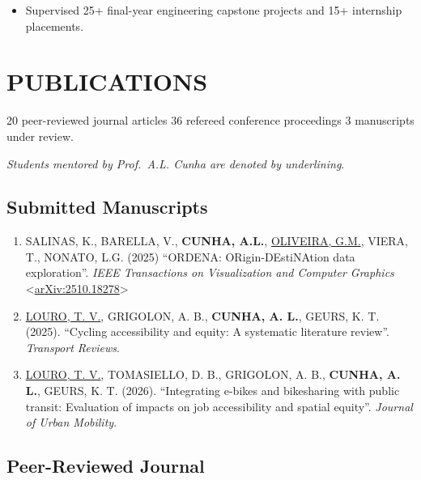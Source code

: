 \documentclass[
  10pt,
  a4paper,
  DIV=11,
  numbers=noendperiod]{scrartcl}
\providecommand{\tightlist}{%
  \setlength{\itemsep}{0pt}\setlength{\parskip}{0pt}}
\begin{document}
\begin{itemize}
\tightlist
\item
  Supervised 25+ final-year engineering capstone projects and 15+
  internship placements.
\end{itemize}

\hrulefill

\section{PUBLICATIONS}\label{sec-publications}

20 peer-reviewed journal articles \textbar{} 36 refereed conference
proceedings \textbar{} 3 manuscripts under review.

\emph{Students mentored by Prof.~A.L. Cunha are denoted by underlining}.

\subsection{Submitted Manuscripts}\label{submitted-manuscripts}

\begin{enumerate}
\def\labelenumi{\arabic{enumi}.}
\item
  SALINAS, K., BARELLA, V., \textbf{CUNHA, A.L.}, \ul{OLIVEIRA, G.M.},
  VIERA, T., NONATO, L.G. (2025) ``ORDENA: ORigin-DEstiNAtion data
  exploration''. \emph{IEEE Transactions on Visualization and Computer
  Graphics}
  \textless{}\href{https://arxiv.org/pdf/2510.18278}{arXiv:2510.18278}\textgreater{}
\item
  \ul{LOURO, T. V.}, GRIGOLON, A. B., \textbf{CUNHA, A. L.}, GEURS, K.
  T. (2025). ``Cycling accessibility and equity: A systematic literature
  review''. \emph{Transport Reviews}.
\item
  \ul{LOURO, T. V.}, TOMASIELLO, D. B., GRIGOLON, A. B., \textbf{CUNHA,
  A. L.}, GEURS, K. T. (2026). ``Integrating e-bikes and bikesharing
  with public transit: Evaluation of impacts on job accessibility and
  spatial equity''. \emph{Journal of Urban Mobility}.
\end{enumerate}

\subsection{Peer-Reviewed Journal}\label{peer-reviewed-journal}
\end{document}
